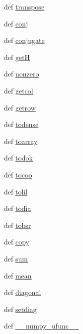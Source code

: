 \begin{DoxyCompactItemize}
\item 
def \hyperlink{classscipy_1_1sparse_1_1base_1_1spmatrix_a931ea410d1786beefa7eea72a8d2f2ad}{transpose}
\item 
def \hyperlink{classscipy_1_1sparse_1_1base_1_1spmatrix_a00a67b78c7cfd4381174a4d9a5a67296}{conj}
\item 
def \hyperlink{classscipy_1_1sparse_1_1base_1_1spmatrix_a215f9caf299eb47bfa0369c63c38d216}{conjugate}
\item 
def \hyperlink{classscipy_1_1sparse_1_1base_1_1spmatrix_af15364db32a7671282fce3488ac66c6f}{get\+H}
\item 
def \hyperlink{classscipy_1_1sparse_1_1base_1_1spmatrix_a829f37a641538f1ebf3f3163be0a5331}{nonzero}
\item 
def \hyperlink{classscipy_1_1sparse_1_1base_1_1spmatrix_ab68aba469a2e41db4ac5285309e34766}{getcol}
\item 
def \hyperlink{classscipy_1_1sparse_1_1base_1_1spmatrix_a195c33b291e0caf99b01d52e3532cb6c}{getrow}
\item 
def \hyperlink{classscipy_1_1sparse_1_1base_1_1spmatrix_a78456156d098fd8e5a1a88d3c5475b74}{todense}
\item 
def \hyperlink{classscipy_1_1sparse_1_1base_1_1spmatrix_ae49a63a68d6cda916f6e4242292c515d}{toarray}
\item 
def \hyperlink{classscipy_1_1sparse_1_1base_1_1spmatrix_a218a88985954879b60c04d2938d0e326}{todok}
\item 
def \hyperlink{classscipy_1_1sparse_1_1base_1_1spmatrix_a7b4040d444b80b5e5d4d4fc16717fb4f}{tocoo}
\item 
def \hyperlink{classscipy_1_1sparse_1_1base_1_1spmatrix_a2c5810382f2f6b1928b9febce9f75d5f}{tolil}
\item 
def \hyperlink{classscipy_1_1sparse_1_1base_1_1spmatrix_aed9faf20f2a9a26201e1edbd23fb04c6}{todia}
\item 
def \hyperlink{classscipy_1_1sparse_1_1base_1_1spmatrix_a3f6dfa622f5559c4b02cae98c02264c3}{tobsr}
\item 
def \hyperlink{classscipy_1_1sparse_1_1base_1_1spmatrix_a1612c858073f3c1db66086c608aacbd0}{copy}
\item 
def \hyperlink{classscipy_1_1sparse_1_1base_1_1spmatrix_a56db1aec41b2225a1e211e42f0d9d861}{sum}
\item 
def \hyperlink{classscipy_1_1sparse_1_1base_1_1spmatrix_adc51ae823bc8e29a499130778950b89c}{mean}
\item 
def \hyperlink{classscipy_1_1sparse_1_1base_1_1spmatrix_a563e111dcce467fbbed96b9c94a234c3}{diagonal}
\item 
def \hyperlink{classscipy_1_1sparse_1_1base_1_1spmatrix_abf17b5fa6a36a2c00e8b30d6fcaa8dcf}{setdiag}
\item 
def \hyperlink{classscipy_1_1sparse_1_1base_1_1spmatrix_afa2f2b2bb7f6c9df5b4647df9b313b35}{\+\_\+\+\_\+numpy\+\_\+ufunc\+\_\+\+\_\+}
\end{DoxyCompactItemize}
